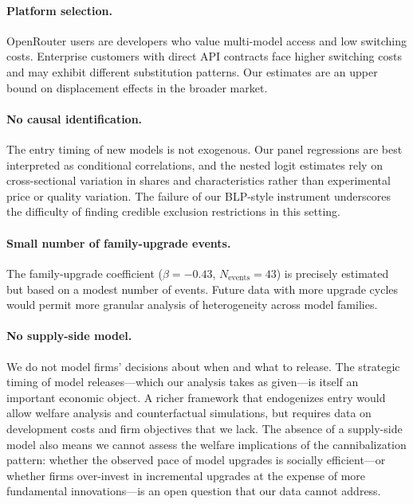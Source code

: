 \documentclass[11pt, a4paper]{article}
\begin{document}
\paragraph{Platform selection.} OpenRouter users are developers who value multi-model access and low switching costs. Enterprise customers with direct API contracts face higher switching costs and may exhibit different substitution patterns. Our estimates are an upper bound on displacement effects in the broader market.

\paragraph{No causal identification.} The entry timing of new models is not exogenous. Our panel regressions are best interpreted as conditional correlations, and the nested logit estimates rely on cross-sectional variation in shares and characteristics rather than experimental price or quality variation. The failure of our BLP-style instrument underscores the difficulty of finding credible exclusion restrictions in this setting.

\paragraph{Small number of family-upgrade events.} The family-upgrade coefficient ($\hat{\beta} = -0.43$, $N_{\text{events}} = 43$) is precisely estimated but based on a modest number of events. Future data with more upgrade cycles would permit more granular analysis of heterogeneity across model families.

\paragraph{No supply-side model.} We do not model firms' decisions about when and what to release. The strategic timing of model releases---which our analysis takes as given---is itself an important economic object. A richer framework that endogenizes entry would allow welfare analysis and counterfactual simulations, but requires data on development costs and firm objectives that we lack. The absence of a supply-side model also means we cannot assess the welfare implications of the cannibalization pattern: whether the observed pace of model upgrades is socially efficient---or whether firms over-invest in incremental upgrades at the expense of more fundamental innovations---is an open question that our data cannot address.
\end{document}

